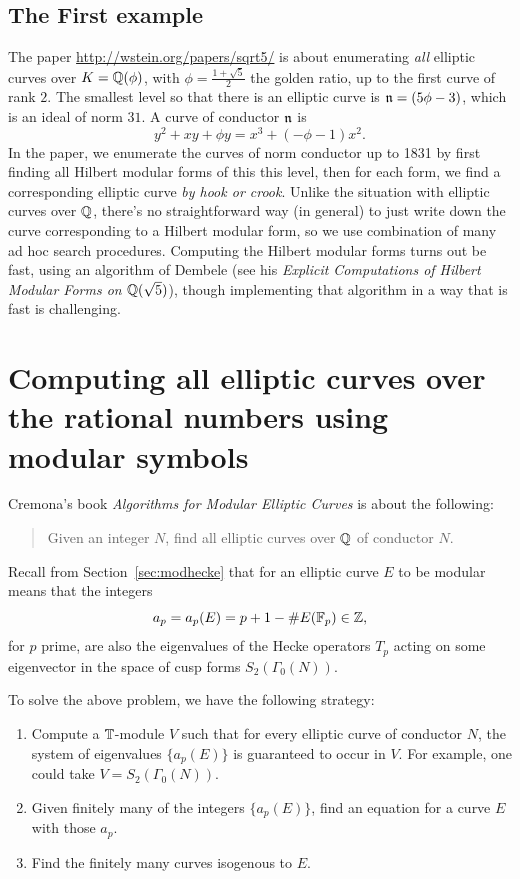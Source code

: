 \documentclass{book}
\begin{document}
\subsection{The First example}
The paper \url{http://wstein.org/papers/sqrt5/} is
about enumerating {\em all} elliptic curves over
$K=\mathbb{Q}(\phi)$, with $\phi=\frac{1+\sqrt{5}}{2}$ the golden
ratio, up to the first curve of rank $2$.
The smallest level so that there is an
elliptic curve is $\mathfrak{n}=(5\phi - 3)$, which is an ideal
of norm $31$. A curve of conductor $\mathfrak{n}$ is
$$
y^2 + x y + \phi{} y = x^{3} + \left(-\phi{} - 1\right) x^{2}.
$$
In the paper, we enumerate the curves of norm conductor up
to 1831 by first finding all Hilbert modular forms of
this this level, then for each form, we find a corresponding
elliptic curve {\em by hook or crook}.  Unlike the situation
with elliptic curves over $\mathbb{Q}$, there's no straightforward way
(in general) to just write down the curve corresponding to a Hilbert
modular form, so we use combination of many ad hoc search
procedures.  Computing the Hilbert modular forms turns out be
fast, using an algorithm of Dembele (see his {\em Explicit Computations of Hilbert Modular Forms on $\mathbb{Q}(\sqrt{5})$}),
though implementing that algorithm in a way that is fast
is challenging.


\newpage
\section{Computing all elliptic curves over the rational numbers using modular symbols}

Cremona's book {\em Algorithms for Modular Elliptic Curves} is about the following:

\begin{quote}
Given an integer $N$, find all elliptic curves over $\mathbb{Q}$
of conductor $N$.
\end{quote}

Recall from Section~\ref{sec:modhecke} that for an elliptic
curve $E$ to be modular means that the integers
$$
  a_p = a_p(E) = p + 1 - \#E(\mathbb{F}_p) \in \mathbb{Z},
$$
for $p$ prime, are also the eigenvalues of the
Hecke operators $T_p$ acting on some eigenvector
in the space of cusp forms $S_2(\Gamma_0(N))$.

To solve the above problem, we have the following
strategy:
\begin{enumerate}
\item Compute a $\mathbb{T}$-module $V$ such that for every
elliptic curve of conductor $N$, the system of
eigenvalues $\{a_p(E)\}$ is guaranteed to occur in $V$.
For example, one could take $V=S_2(\Gamma_0(N))$.
\item Given finitely many of the integers $\{a_p(E)\}$,
find an equation for a curve $E$ with those $a_p$.
\item Find the finitely many curves isogenous to $E$.
\end{enumerate}
\end{document}
